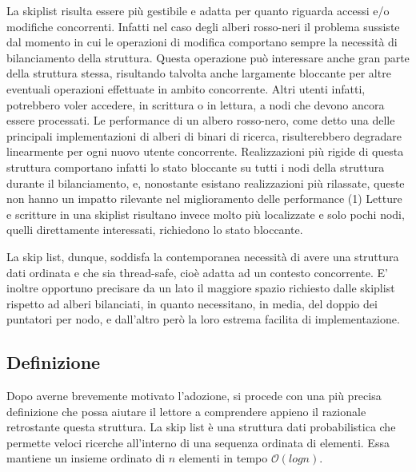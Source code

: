 	La skiplist risulta essere più gestibile e adatta per quanto riguarda accessi e/o modifiche concorrenti. Infatti nel caso degli alberi rosso-neri il problema sussiste dal momento in cui le operazioni di modifica comportano sempre la necessità di bilanciamento della struttura. Questa operazione può interessare anche gran parte della struttura stessa, risultando talvolta anche largamente bloccante per altre eventuali operazioni effettuate in ambito concorrente. Altri utenti infatti, potrebbero voler accedere, in scrittura o in lettura, a nodi che devono ancora essere processati. Le performance di un albero rosso-nero, come detto una delle principali implementazioni di alberi di binari di ricerca, risulterebbero degradare linearmente per ogni nuovo utente concorrente. Realizzazioni più rigide di questa struttura comportano infatti lo stato bloccante su tutti i nodi della struttura durante il bilanciamento, e, nonostante esistano realizzazioni più rilassate, queste non hanno un impatto rilevante nel miglioramento delle performance (1)
	Letture e scritture in una skiplist risultano invece molto più localizzate e solo pochi nodi, quelli direttamente interessati, richiedono lo stato bloccante.
	
	La skip list, dunque, soddisfa la contemporanea necessità di avere una struttura dati ordinata e che sia thread-safe, cioè adatta ad un contesto concorrente.
	E' inoltre opportuno precisare da un lato il maggiore spazio richiesto dalle skiplist rispetto ad alberi bilanciati, in quanto necessitano, in media, del doppio dei puntatori per nodo, e dall'altro però la loro estrema facilita di implementazione.
	
	\subsection{Definizione}
	
%		

	Dopo averne brevemente motivato l'adozione, si procede con una più precisa definizione che possa aiutare il lettore a comprendere appieno il razionale retrostante questa struttura. 
	La skip list è una struttura dati probabilistica che permette veloci ricerche all'interno di una sequenza ordinata di elementi. Essa mantiene un insieme ordinato di $ n $ elementi in tempo $\mathcal{O}(log{}n)$.
	

